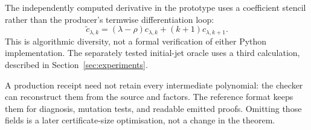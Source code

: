 The independently computed derivative in the prototype uses a coefficient
stencil rather than the producer's termwise differentiation loop:
\begin{equation}
 \widetilde c_{\lambda,k}
 = (\lambda-\rho)c_{\lambda,k}+(k+1)c_{\lambda,k+1}.
 \label{eq:stencil}
\end{equation}
This is algorithmic diversity, not a formal verification of either Python
implementation. The separately tested initial-jet oracle uses a third
calculation, described in Section~\ref{sec:experiments}.

A production receipt need not retain every intermediate polynomial: the checker
can reconstruct them from the source and factors. The reference format keeps
them for diagnosis, mutation tests, and readable emitted proofs. Omitting those
fields is a later certificate-size optimisation, not a change in the theorem.
